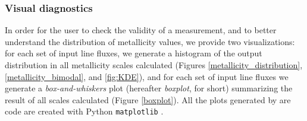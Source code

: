 \documentclass{emulateapj}
\begin{document}



\subsubsection{Visual diagnostics}\label{vizs}
In order for the user to check the validity of a measurement, and to better understand the distribution of metallicity values, we provide two visualizations: for each set of input line fluxes, we generate a histogram of the output distribution in all metallicity scales calculated (Figures \ref{metallicity_distribution}, \ref{metallicity_bimodal}, and \ref{fig:KDE}), and for each set of input line fluxes we generate a \emph{box-and-whiskers} plot (hereafter \emph{boxplot}, for short) summarizing the result of all scales calculated (Figure \ref{boxplot}). All the plots generated by are code are created with Python \verb=matplotlib= \citep{hunter07}.
\end{document}
